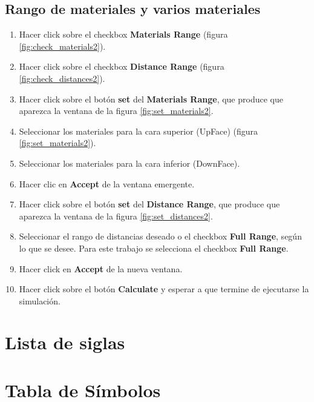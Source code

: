 \section{Rango de materiales y varios materiales}
\begin{enumerate}
			\item Hacer click sobre el checkbox \textbf{Materials Range} (figura \ref{fig:check_materials2}).
			\item Hacer click sobre el checkbox \textbf{Distance Range} (figura \ref{fig:check_distances2}).
			\item Hacer click sobre el botón \textbf{set} del \textbf{Materials Range}, que produce que aparezca la ventana de la figura \ref{fig:set_materials2}.
			\item Seleccionar los materiales para la cara superior (UpFace) (figura \ref{fig:set_materials2}).
			\item Seleccionar los materiales para la cara inferior (DownFace).
			\item Hacer clic en \textbf{Accept} de la ventana emergente.
			\item Hacer click sobre el botón \textbf{set} del \textbf{Distance Range}, que produce que aparezca la ventana de la figura \ref{fig:set_distances2}.
			\item Seleccionar el rango de distancias deseado o el checkbox \textbf{Full Range}, según lo que se desee. Para este trabajo se selecciona el checkbox \textbf{Full Range}.
			\item Hacer click en \textbf{Accept} de la nueva ventana.
			\item Hacer click sobre el botón \textbf{Calculate} y esperar a que termine de ejecutarse la simulación.
\end{enumerate}

\chapter{Lista de siglas}

\glsaddall
\setlength{\glsdescwidth}{\textwidth}
\printglossary[type=\acronymtype,title=Acr\'{o}nimos,style=longheader]%
\let\cleardoublepage\clearpage
\chapter{Tabla de Símbolos}
\setlength{\glsdescwidth}{15cm}
\printglossary[type=symbolslist,style=symbunitlong]
\let\cleardoublepage\clearpage
